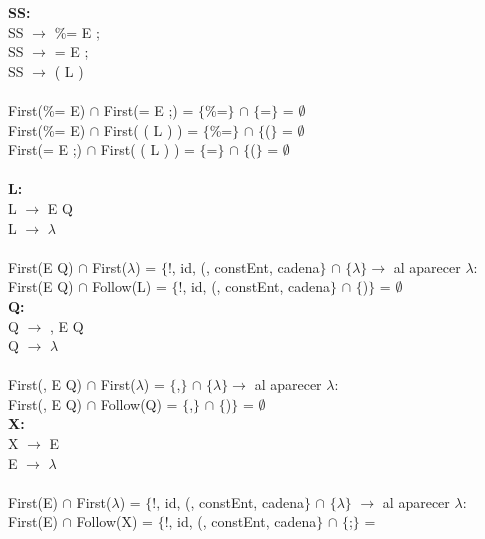 \documentclass{article}[a4paper]
\newcommand\tab[1][1cm]{\hspace*{#1}}
\begin{document}
\textbf{SS:}\\
\tab SS $\rightarrow$ \%= E ;\\
\tab SS $\rightarrow$ = E ;\\
\tab SS $\rightarrow$ ( L )\\ \\
\tab \tab First(\%= E) $\cap$ First(= E ;) = $\lbrace$\%=$\rbrace$ $\cap$ $\lbrace$=$\rbrace$ = $\emptyset$\\
\tab \tab First(\%= E) $\cap$ First( ( L ) ) = $\lbrace$\%=$\rbrace$ $\cap$ $\lbrace$($\rbrace$ = $\emptyset$\\
\tab \tab First(= E ;) $\cap$ First( ( L ) ) = $\lbrace$=$\rbrace$ $\cap$ $\lbrace$($\rbrace$ = $\emptyset$\\ \\

\textbf{L:}\\
\tab L $\rightarrow$ E Q\\
\tab L $\rightarrow$ $\lambda$\\ \\
\tab \tab First(E Q) $\cap$ First($\lambda$) = $\lbrace$!, id, (, constEnt, cadena$\rbrace$ $\cap$ $\lbrace$$\lambda$$\rbrace$$\rightarrow$ al aparecer $\lambda$:\\
\tab \tab First(E Q) $\cap$ Follow(L) = $\lbrace$!, id, (, constEnt, cadena$\rbrace$ $\cap$ $\lbrace$)$\rbrace$ = $\emptyset$\\

\textbf{Q:}\\
\tab Q $\rightarrow$ , E Q\\
\tab Q $\rightarrow$ $\lambda$\\ \\
\tab \tab First(, E Q) $\cap$ First($\lambda$) = $\lbrace$,$\rbrace$ $\cap$ $\lbrace$$\lambda$$\rbrace$$\rightarrow$ al aparecer $\lambda$:\\
\tab \tab First(, E Q) $\cap$ Follow(Q) = $\lbrace$,$\rbrace$ $\cap$ $\lbrace$)$\rbrace$ = $\emptyset$\\

\textbf{X:}\\
\tab X $\rightarrow$ E\\
\tab E $\rightarrow$ $\lambda$\\ \\
\tab \tab First(E) $\cap$ First($\lambda$) = $\lbrace$!, id, (, constEnt, cadena$\rbrace$ $\cap$ $\lbrace$$\lambda$$\rbrace$ $\rightarrow$ al aparecer $\lambda$:\\
\tab \tab First(E) $\cap$ Follow(X) = $\lbrace$!, id, (, constEnt, cadena$\rbrace$ $\cap$ $\lbrace$;$\rbrace$ = \emptyset \\
\end{document}

